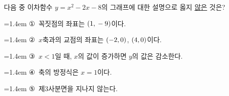 \hspace*{2mm}\begin{minipage}[t]{\dimexpr\linewidth-2mm\relax}\vspace{0pt}
다음 중 이차함수 $y=x^2-2x-8$의 그래프에 대한 설명으로 옳지 \underline{않은} 것은?
\par\medskip\par\noindent\hangindent=1.4em {\small ①}\ 꼭짓점의 좌표는 $(1{,}\mkern3mu -9)$이다.\par\noindent\hangindent=1.4em {\small ②}\ $x$축과의 교점의 좌표는 $(-2{,}\mkern3mu 0)$, $(4{,}\mkern3mu 0)$이다.\par\noindent\hangindent=1.4em {\small ③}\ $x<1$일 때, $x$의 값이 증가하면 $y$의 값은 감소한다.\par\noindent\hangindent=1.4em {\small ④}\ 축의 방정식은 $x=1$이다.\par\noindent\hangindent=1.4em {\small ⑤}\ 제$3$사분면을 지나지 않는다.\par\medskip\end{minipage}
